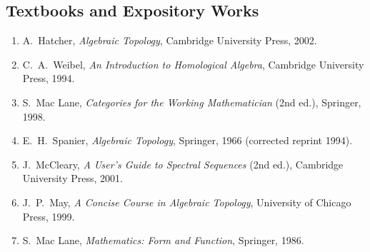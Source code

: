 \subsection*{Textbooks and Expository Works}
\begin{enumerate}
    \item A.\ Hatcher, \textit{Algebraic Topology}, Cambridge University Press, 2002.
    \item C.\ A.\ Weibel, \textit{An Introduction to Homological Algebra}, Cambridge University Press, 1994.
    \item S.\ Mac Lane, \textit{Categories for the Working Mathematician} (2nd ed.), Springer, 1998.
    \item E.\ H.\ Spanier, \textit{Algebraic Topology}, Springer, 1966 (corrected reprint 1994).
    \item J.\ McCleary, \textit{A User's Guide to Spectral Sequences} (2nd ed.), Cambridge University Press, 2001.
    \item J.\ P.\ May, \textit{A Concise Course in Algebraic Topology}, University of Chicago Press, 1999.
    \item S.\ Mac Lane, \textit{Mathematics: Form and Function}, Springer, 1986.
\end{enumerate}
